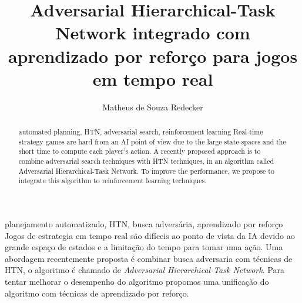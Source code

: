 \documentclass[portuguese,oneside]{tcc}
\author{Matheus de Souza Redecker}
\title{Adversarial Hierarchical-Task Network integrado com aprendizado por reforço para jogos em tempo real}
      {Adversarial Hierarchical-Task Network integrated with reinforcement learning for Real-Time Games}
\begin{document}




\begin{resumo}{planejamento automatizado, HTN, busca adversária, aprendizado por reforço}
Jogos de estrategia em tempo real são difíceis ao ponto de vista da IA devido ao grande espaço de estados e a limitação do tempo para tomar uma ação. 
Uma abordagem recentemente proposta é combinar busca adversaria com técnicas de HTN, o algoritmo é chamado de \textit{Adversarial Hierarchical-Task Network}.
Para tentar melhorar o desempenho do algoritmo propomos uma unificação do algoritmo com técnicas de aprendizado por reforço. 
\end{resumo}

\begin{abstract}{automated planning, HTN, adversarial search, reinforcement learning}
Real-time strategy games are hard from an AI point of view due to the large state-spaces and the short time to compute each player's action. 
A recently proposed approach is to combine adversarial search techniques with HTN techniques, in an algorithm called Adversarial Hierarchical-Task Network. 
To improve the performance, we propose to integrate this algorithm to reinforcement learning techniques. 
\end{abstract}
\end{document}
